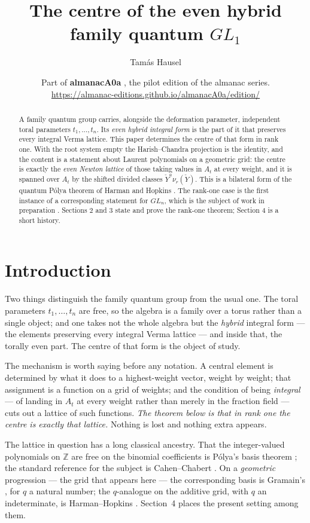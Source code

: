 \documentclass[11pt]{article}
\title{\textbf{The centre of the even hybrid family quantum $GL_1$}}
\author{Tam\'as Hausel}
\date{\normalsize Part of \textbf{almanacA0a} \cite{almanacA0a}, the pilot edition of the
almanac series.\\[2pt]
\small\url{https://almanac-editions.github.io/almanacA0a/edition/}}
\newcommand{\At}{A_t}
\newcommand{\Yc}{\check Y}
\begin{document}
\maketitle



\begin{abstract}\noindent
A family quantum group carries, alongside the deformation parameter, independent toral parameters
$t_1,\dots,t_n$. Its \emph{even hybrid integral form} is the part of it that preserves every
integral Verma lattice. This paper determines the centre of that form in rank one. With the root
system empty the Harish--Chandra projection is the identity, and the content is a statement about
Laurent polynomials on a geometric grid: the centre is exactly the \emph{even Newton lattice} of
those taking values in $\At$ at every weight, and it is spanned over $\At$ by the shifted divided
classes $\Yc^{u}\nu_r(\Yc)$. This is a bilateral form of the quantum P\'olya theorem of Harman and
Hopkins \cite{HarmanHopkins}. The rank-one case is the first instance of a corresponding statement
for $GL_n$, which is the subject of work in preparation \cite{HauselLowit}. Sections 2 and 3 state
and prove the rank-one theorem; Section 4 is a short history.
\end{abstract}

\section{Introduction}

\noindent
Two things distinguish the family quantum group from the usual one. The toral parameters
$t_1,\dots,t_n$ are free, so the algebra is a family over a torus rather than a single object; and
one takes not the whole algebra but the \emph{hybrid} integral form --- the elements preserving
every integral Verma lattice --- and inside that, the torally even part. The centre of that form is
the object of study.

\medskip\noindent
The mechanism is worth saying before any notation. A central element is determined by what it does
to a highest-weight vector, weight by weight; that assignment is a function on a grid of weights;
and the condition of being \emph{integral} --- of landing in $\At$ at every weight rather than
merely in the fraction field --- cuts out a lattice of such functions. \emph{The theorem below is
that in rank one the centre is exactly that lattice.} Nothing is lost and nothing extra appears.

\medskip\noindent
The lattice in question has a long classical ancestry. That the integer-valued polynomials on
$\mathbb Z$ are free on the binomial coefficients is P\'olya's basis theorem
\cite[Prop.~1.1]{HarmanHopkins}; the standard reference for the subject is Cahen--Chabert
\cite{CahenChabert}. On a \emph{geometric} progression --- the grid that appears here --- the
corresponding basis is Gramain's \cite[Prop.~2.2]{Gramain}, for $q$ a natural number; the
$q$-analogue on the additive grid, with $q$ an indeterminate, is Harman--Hopkins
\cite{HarmanHopkins}. Section~4 places the present setting among them.
\end{document}
